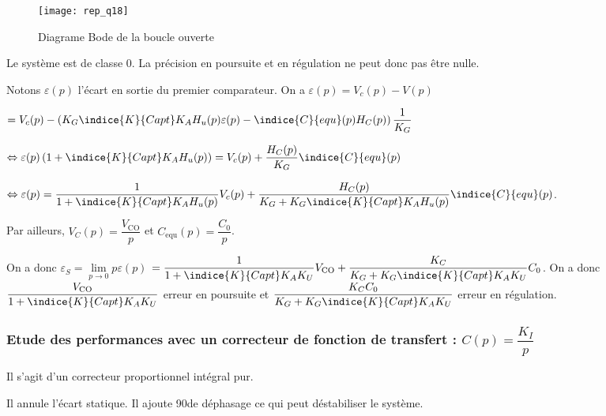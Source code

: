\begin{figure}[t]
\centering
\texttt{[image: rep\_q18]}
\caption{Diagrame Bode de la boucle ouverte \label{rep_q_18}}
\end{figure}

\fi


\ifprof
\begin{corrige}
Le système est de classe 0. La précision en poursuite et en régulation ne peut donc pas être nulle.

Notons $\varepsilon(p)$ l'écart en sortie du premier comparateur. On a  
$\varepsilon(p) = V_c(p)-V(p)$

$=V_c(p)-\left(K_G\indice{K}{Capt}K_A H_u(p) \varepsilon(p)- \indice{C}{equ}(p)H_C(p) \right)\dfrac{1}{K_G}$ 

$\Leftrightarrow \varepsilon(p)\left( 1+ \indice{K}{Capt}K_A H_u(p)\right)=V_c(p)+  \dfrac{H_C(p)}{K_G}\indice{C}{equ}(p)$

$\Leftrightarrow \varepsilon(p)=\dfrac{1}{1+ \indice{K}{Capt}K_A H_u(p)}V_c(p)+ \dfrac{H_C(p)}{K_G+ K_G\indice{K}{Capt}K_A H_u(p)}\indice{C}{equ}(p)$.

Par ailleurs, $V_C (p)=\dfrac{V_{\text{CO}}}{p}$ et $C_{\text{equ}} (p) = \dfrac{C_0}{p}$.

On a donc $\varepsilon_S = \lim\limits_{p\to 0} p \varepsilon(p)$
$=\dfrac{1}{1+ \indice{K}{Capt}K_A K_U}V_{\text{CO}}+ \dfrac{K_C}{K_G+ K_G\indice{K}{Capt}K_A K_U}C_0$.
On a donc $\dfrac{V_{\text{CO}}}{1+ \indice{K}{Capt}K_A K_U}$ erreur en poursuite et 
$\dfrac{K_C C_0}{K_G+ K_G\indice{K}{Capt}K_A K_U}$ erreur en régulation.
\end{corrige}
\else
\fi


\subsubsection{Etude des performances avec un correcteur de fonction de transfert : $C(p)=\dfrac{K_I}{p}$}

\ifprof
\begin{corrige}
Il s'agit d'un correcteur proportionnel intégral pur. 

Il annule l'écart statique. Il ajoute 90\degres de déphasage ce qui peut déstabiliser le système.
\end{corrige}
\else
\fi


